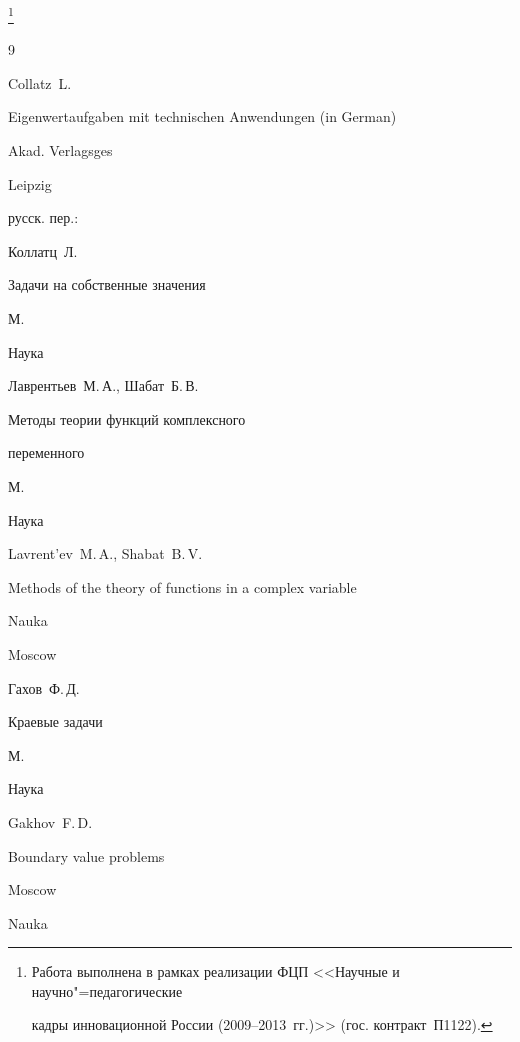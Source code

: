 \thanks{Работа выполнена в рамках реализации ФЦП <<Научные и научно"=педагогические

кадры инновационной России (2009--2013~гг.)>> (гос. контракт\No~П1122).}



\renewcommand{\baselinestretch}{0.83}



\begin{thebibliography}{9}




\by  Collatz~L. 

\book Eigenwertaufgaben mit technischen Anwendungen (in German)

\publ Akad. Verlagsges

\publaddr Leipzig 



\rtransl русск. пер.:~

\by Коллатц~Л.

\book Задачи на собственные значения

\publaddr М.

\publ Наука






\by Лаврентьев~М.\,А., Шабат~Б.\,В.

\book Методы теории функций комплексного

переменного

\publaddr М.

\publ Наука



\misctransl

\by Lavrent'ev~M.\,A., Shabat~B.\,V. 

\book Methods of the theory of functions in a complex variable

\publ Nauka

\publaddr Moscow






\by Гахов~Ф.\,Д.

\book Краевые задачи

\publaddr  М.

\publ Наука



\misctransl 

\by Gakhov~F.\,D.

\book Boundary value problems

\publaddr Moscow

\publ Nauka





\end{thebibliography}
